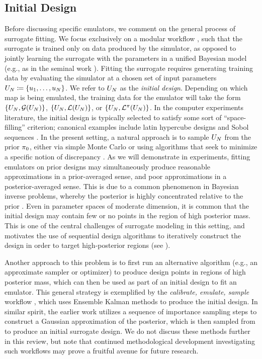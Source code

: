 \documentclass[12pt]{article}
\begin{document}
\subsection{Initial Design}
Before discussing specific emulators, we comment on the general process of surrogate fitting.
We focus exclusively on a modular workflow \citep{modularization}, such that the surrogate is
 trained only on data produced
by the simulator, as opposed to jointly learning the surrogate with the parameters in a 
unified Bayesian model (e.g., as in the seminal work \citet{KOH}). Fitting the surrogate requires 
generating training data by evaluating the simulator at a chosen set of input parameters
$U_{N} \coloneqq \{u_1, \dots, u_{N}\}$. We refer to $U_{N}$ as the \textit{initial design}.
Depending on which map is being emulated, the training data for the emulator will take the form 
$\{U_{N}, \mathcal{G}(U_{N})\}$, $\{U_{N}, \mathcal{L}(U_{N})\}$, or $\{U_{N}, \mathcal{L}^{\pi}(U_{N})\}$. 
In the computer experiments literature, 
the initial design is typically selected to satisfy some sort of ``space-filling'' criterion; canonical examples 
include latin hypercube designs and Sobol sequences \citep{initDesignReview}. In the present setting, a natural 
approach is to sample $U_{N}$ from the prior $\pi_0$, either via simple Monte Carlo or using 
algorithms that seek to minimize a specific notion of discrepancy \citep{supportPoints, SteinPoints}.
As we will demonstrate in experiments, fitting emulators on prior designs may simultaneously produce 
reasonable approximations in a prior-averaged sense, and poor approximations in a posterior-averaged
sense. This is due to a common phenomenon in Bayesian inverse problems, whereby the posterior is highly 
concentrated relative to the prior \citep{StuartTeck2,PCEBIP}. Even in parameter spaces of moderate dimension, 
it is common that the initial design may contain few or no points in the region of high posterior mass. 
This is one of the central challenges of surrogate modeling in this setting, and motivates the use of sequential 
design algorithms to iteratively construct the design in order to target high-posterior regions (see ).

Another approach to this problem is to first run an alternative algorithm (e.g., an approximate 
sampler or optimizer) to produce design points in regions of high posterior mass, which can then 
be used as part of an initial design to fit an emulator. This general strategy is exemplified by the 
\textit{calibrate, emulate, sample} workflow \citep{CES,idealizedGCM,CESSoftware,FATES_CES}, 
which uses Ensemble Kalman methods to produce the initial design. In similar spirit, the earlier work 
\citet{emPostDens} utilizes a sequence of importance sampling steps to construct a Gaussian 
approximation of the posterior, which is then sampled from to produce an initial surrogate design.
We do not discuss these methods further in this review, but note that continued methodological 
development investigating such workflows may prove a fruitful avenue for future research. 
\end{document}
